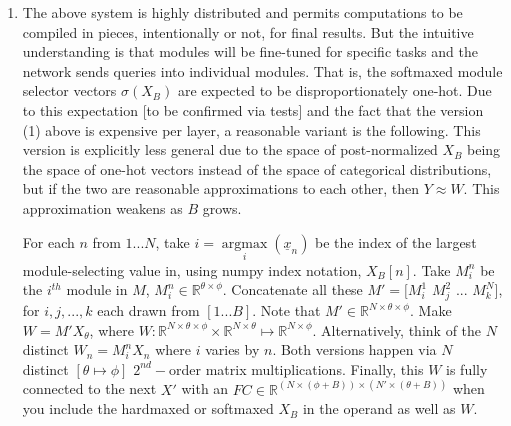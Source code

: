 \documentclass[12pt]{article}
\begin{document}
\begin{itemize}
\begin{enumerate}
	\item The above system is highly distributed and permits computations to be compiled in pieces, intentionally or not, for final results.  But the intuitive understanding is that modules will be fine-tuned for specific tasks and the network sends queries into individual modules.  That is, the softmaxed module selector vectors $\sigma(X_B)$ are expected to be disproportionately one-hot.  Due to this expectation [to be confirmed via tests] and the fact that the version (1) above is expensive per layer, a reasonable variant is the following.  This version is explicitly less general due to the space of post-normalized $X_B$ being the space of one-hot vectors instead of the space of categorical distributions, but if the two are reasonable approximations to each other, then $Y\approx W$.  This approximation weakens as $B$ grows.  \par 
	\qquad For each $n$ from $1...N$, take $i = \underset{i}{\operatorname{argmax}} (\underline{x}_n)$ be the index of the largest module-selecting value in, using numpy index notation, $X_B[n]$.  Take $M_i^n$ be the $i^{th}$ module in $M$, $M_i^n \in \mathbb{R}^{\theta \times \phi}$.  Concatenate all these $M' = [M_i^1$ $M_j^2$ ...  $M_k^N]$, for $i,j,...,k$ each drawn from $[1...B]$.  Note that $M' \in \mathbb{R}^{N \times \theta \times \phi}$.  Make $W = M'X_\theta$, where $W:\mathbb{R}^{N \times \theta \times \phi} \times \mathbb{R}^{N \times \theta} \mapsto \mathbb{R}^{N\times \phi}$.  Alternatively, think of the $N$ distinct $W_n = M_i^n X_n$ where $i$ varies by $n$.  Both versions happen via $N$ distinct $[\theta \mapsto \phi]$ $2^{nd}-$order matrix multiplications.  Finally, this $W$ is fully connected to the next $X'$ with an $FC \in \mathbb{R}^{(N\times(\phi+B))\times(N'\times(\theta+B))}$ when you include the hardmaxed or softmaxed $X_B$ in the operand as well as $W$. 


\end{enumerate}
\end{itemize}
\end{document}
